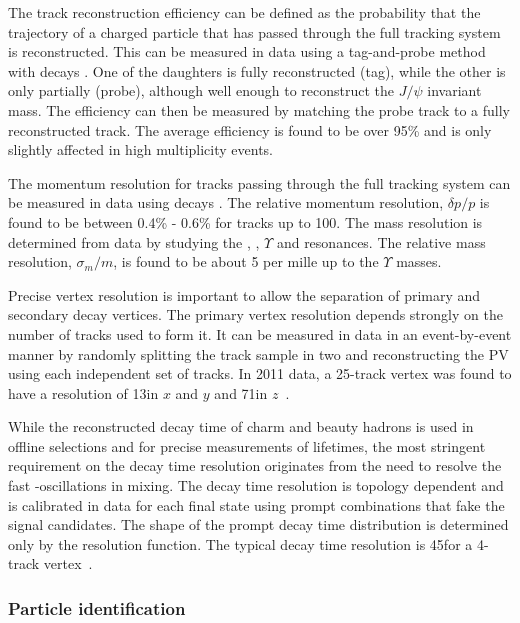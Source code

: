 The track reconstruction efficiency can be defined as the probability that the trajectory of a charged particle that has passed through the full tracking system is reconstructed. This can be measured in data using a tag-and-probe method with \decay{\jpsi}{\mumu} decays \cite{LHCb-DP-2013-002}. One of the daughters is fully reconstructed (tag), while the other is only partially (probe), although well enough to reconstruct the $J/\psi$ invariant mass.  The efficiency can then be measured by matching the probe track to a fully reconstructed track. The average efficiency is found to be over 95\% and is only slightly affected in high multiplicity events.

The momentum resolution for tracks passing through the full tracking system can be measured in data using \decay{\jpsi}{\mumu} decays \cite{LHCb-DP-2014-002}. The relative momentum resolution, $\delta p/p$ is found to be between 0.4\% - 0.6\% for tracks up to 100\gevc. The mass resolution is determined from data by studying the \jpsi, \psitwos, $\Upsilon$ and \Z resonances. The relative mass resolution, $\sigma_{m}/m$, is found to be about 5 per mille up to the $\Upsilon$ masses.

Precise vertex resolution is important to allow the separation of primary and secondary decay vertices. The primary vertex resolution depends strongly on the number of tracks used to form it. It can be measured in data in an event-by-event manner by randomly splitting the track sample in two and reconstructing the PV using each independent set of tracks. In 2011 data, a 25-track vertex was found to have a resolution of 13\mum in $x$ and $y$ and 71\mum in $z$~\cite{LHCb-DP-2014-002}.
 
While the reconstructed decay time of charm and beauty hadrons is used in offline selections and for precise measurements of lifetimes, the most stringent requirement on the decay time resolution originates from the need to resolve the fast \Bs-\Bsb oscillations in mixing. The decay time resolution is topology dependent and is calibrated in data for each final state using prompt combinations that fake the signal candidates. The shape of the prompt decay time distribution is determined only by the resolution function. The typical decay time resolution is 45\fs for a 4-track vertex~\cite{LHCb-DP-2014-002}.

\subsubsection{Particle identification}
\label{sec:lhcb:pid}

